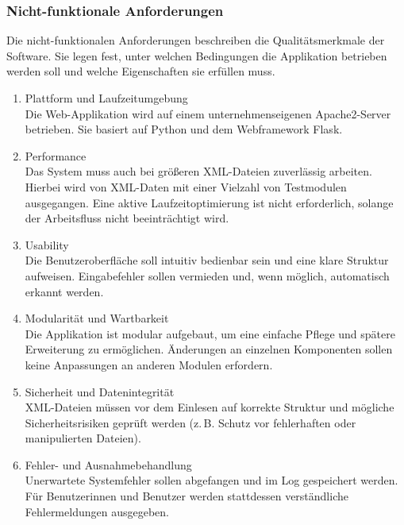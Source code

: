 \subsubsection{Nicht-funktionale Anforderungen}
\label{subsec:nicht-funktionale-anforderungen}

Die nicht-funktionalen Anforderungen beschreiben die Qualitätsmerkmale der Software.
Sie legen fest, unter welchen Bedingungen die Applikation betrieben werden soll und welche Eigenschaften sie erfüllen muss.

\begin{enumerate}
  \item Plattform und Laufzeitumgebung \\
  Die Web-Applikation wird auf einem unternehmenseigenen Apache2-Server betrieben.
  Sie basiert auf Python und dem Webframework Flask.

  \item Performance \\
  Das System muss auch bei größeren XML-Dateien zuverlässig arbeiten.
  Hierbei wird von XML-Daten mit einer Vielzahl von Testmodulen ausgegangen.
  Eine aktive Laufzeitoptimierung ist nicht erforderlich, solange der Arbeitsfluss nicht beeinträchtigt wird.

  \item Usability \\
  Die Benutzeroberfläche soll intuitiv bedienbar sein und eine klare Struktur aufweisen.
  Eingabefehler sollen vermieden und, wenn möglich, automatisch erkannt werden.

  \item Modularität und Wartbarkeit \\
  Die Applikation ist modular aufgebaut, um eine einfache Pflege und spätere Erweiterung zu ermöglichen.
  Änderungen an einzelnen Komponenten sollen keine Anpassungen an anderen Modulen erfordern.

  \item Sicherheit und Datenintegrität \\
  XML-Dateien müssen vor dem Einlesen auf korrekte Struktur und mögliche Sicherheitsrisiken geprüft werden
  (z.\,B. Schutz vor fehlerhaften oder manipulierten Dateien).

  \item Fehler- und Ausnahmebehandlung \\
  Unerwartete Systemfehler sollen abgefangen und im Log gespeichert werden.
  Für Benutzerinnen und Benutzer werden stattdessen verständliche Fehlermeldungen ausgegeben.


\end{enumerate}
